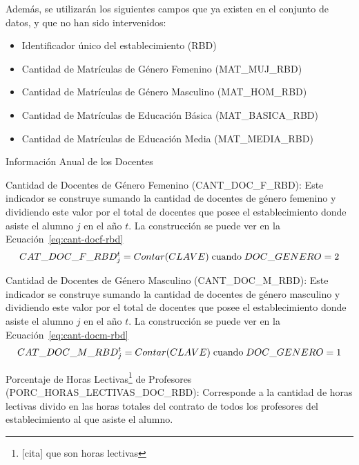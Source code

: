 \begin{longdescription}
\begin{longdescription}
            \end{longdescription} 
            Además, se utilizarán los siguientes campos que ya existen en el conjunto de datos, y que no han sido intervenidos:
            \begin{itemize}
              \item Identificador único del establecimiento (RBD)
              \item Cantidad de Matrículas de Género Femenino (MAT\_MUJ\_RBD)
              \item Cantidad de Matrículas de Género Masculino (MAT\_HOM\_RBD)
              \item Cantidad de Matrículas de Educación Básica (MAT\_BASICA\_RBD)
              \item Cantidad de Matrículas de Educación Media (MAT\_MEDIA\_RBD)
            \end{itemize}
            \item[Información Anual de los Docentes] \hfill \\
            \begin{longdescription}
                \item[Cantidad de Docentes de Género Femenino]
                (CANT\_DOC\_F\_RBD):
                Este indicador se construye sumando la cantidad de docentes de género femenino y dividiendo este valor por el total de docentes que posee el establecimiento donde asiste el alumno $j$ en el año $t$. La construcción se puede ver en la Ecuación~\ref{eq:cant-docf-rbd}
              \begin{equation}
              \centering
                CAT\_DOC\_F\_RBD_{j}^{t} = Contar(CLAVE) \; \mbox{cuando} \; DOC\_GENERO = 2
                \label{eq:cant-docf-rbd}
              \end{equation}
                \item[Cantidad de Docentes de Género Masculino]
                (CANT\_DOC\_M\_RBD):
                 Este indicador se construye sumando la cantidad de docentes de género masculino y dividiendo este valor por el total de docentes que posee el establecimiento donde asiste el alumno $j$ en el año $t$. La construcción se puede ver en la Ecuación~\ref{eq:cant-docm-rbd}
                  \begin{equation}
                  \centering
                    CAT\_DOC\_M\_RBD_{j}^{t} = Contar(CLAVE) \; \mbox{cuando} \; DOC\_GENERO = 1
                    \label{eq:cant-docm-rbd}
                  \end{equation}
                \item[Porcentaje de Horas Lectivas\footnote{[cita] que son horas lectivas} de Profesores](PORC\_HORAS\_LECTIVAS\_DOC\_RBD): Corresponde a la cantidad de horas lectivas divido en las horas totales del contrato de todos los profesores del establecimiento al que asiste el alumno.
                

\end{longdescription}
\end{longdescription}
